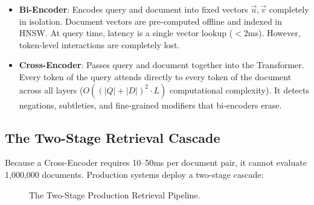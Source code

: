 \begin{itemize}[leftmargin=18pt]
  \item \textbf{Bi-Encoder}: Encodes query and document into fixed vectors $\vec{u}, \vec{v}$ completely in isolation. Document vectors are pre-computed offline and indexed in HNSW. At query time, latency is a single vector lookup ($<2$ms). However, token-level interactions are completely lost.
  \item \textbf{Cross-Encoder}: Passes query and document together into the Transformer. Every token of the query attends directly to every token of the document across all layers ($O((|Q| + |D|)^2 \cdot L)$ computational complexity). It detects negations, subtleties, and fine-grained modifiers that bi-encoders erase.
\end{itemize}

\subsection{The Two-Stage Retrieval Cascade}
Because a Cross-Encoder requires 10--50ms per document pair, it cannot evaluate 1,000,000 documents. Production systems deploy a two-stage cascade:

\begin{figure}[htbp]
\centering
{}
\caption{The Two-Stage Production Retrieval Pipeline.}
\label{fig:two_stage_pipeline}
\end{figure}


